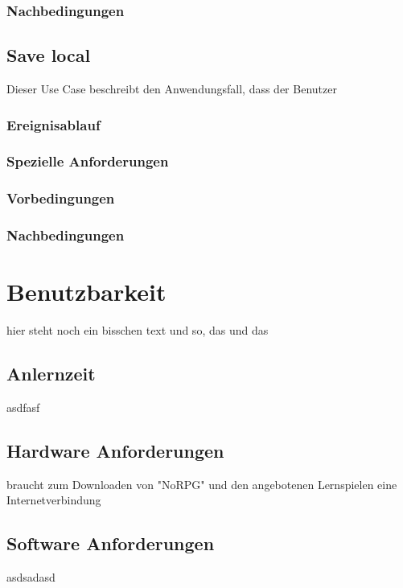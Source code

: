 		\subsubsection{Nachbedingungen}
	
	\subsection{Save local}
		Dieser Use Case beschreibt den Anwendungsfall, dass der Benutzer 
			
		\subsubsection{Ereignisablauf}
			
		\subsubsection{Spezielle Anforderungen}		
			
		\subsubsection{Vorbedingungen}
			
		\subsubsection{Nachbedingungen}
	
	
	
\section{Benutzbarkeit}
hier steht noch ein bisschen text und so, das und das
	
	\subsection{Anlernzeit}
		asdfasf
	
	\subsection{Hardware Anforderungen}
		braucht zum Downloaden von "NoRPG" und den angebotenen Lernspielen eine Internetverbindung	
	
	\subsection{Software Anforderungen}
		asdsadasd
	
